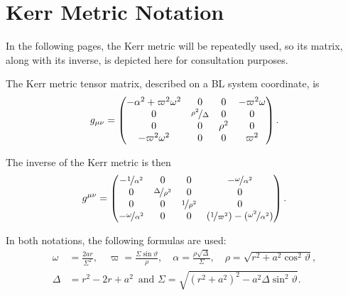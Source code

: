 \section{Kerr Metric Notation}

In the following pages, the Kerr metric will be repeatedly used, so its matrix, along with its inverse, is depicted here for consultation purposes.

The Kerr metric tensor matrix, described on a \ac{BL} system coordinate, is
\[
	g_{\mu\nu} = \begin{pmatrix}
		-\alpha^2 + \varpi^2\omega^2 & 0 & 0 & -\varpi^2\omega \\
		0 & \nicefrac{\rho^2}{\Delta} & 0 & 0 \\
		0 & 0 & \rho^2 & 0 \\
		-\varpi^2\omega^2 & 0 & 0 & \varpi^2
	\end{pmatrix}.
\]

The inverse of the Kerr metric is then
\[
	g^{\mu\nu} = \begin{pmatrix}
		-\nicefrac{1}{\alpha^2} & 0 & 0 & -\nicefrac{\omega}{\alpha^2} \\
		0 & \nicefrac{\Delta}{\rho^2} & 0 & 0 \\
		0 & 0 & \nicefrac{1}{\rho^2} & 0 \\
		-\nicefrac{\omega}{\alpha^2} & 0 & 0 & (\nicefrac{1}{\varpi^2}) - (\nicefrac{\omega^2}{\alpha^2})
	\end{pmatrix}.
\]


In both notations, the following formulas are used:
\begin{align}
	\omega &= \frac{2ar}{\Sigma^2},  \quad \varpi = \frac{\Sigma\sin\vartheta}{\rho}, \quad \alpha = \frac{\rho\sqrt{\Delta}}{\Sigma}, \quad \rho = \sqrt{r^2 + a^2\cos^2\vartheta},\nonumber\\
	\Delta &= r^2 - 2r + a^2 \, \textrm{ and } \Sigma = \sqrt{(r^2+a^2)^2 - a^2\Delta\sin^2\vartheta}.
	\label{eq:termdef}
\end{align}
